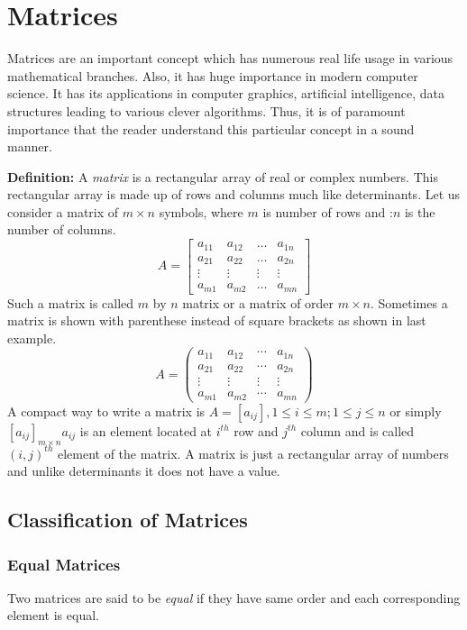 \chapter{Matrices}
Matrices are an important concept which has numerous real life usage in various mathematical branches. Also, it has huge importance
in modern computer science. It has its applications in computer graphics, artificial intelligence, data structures leading to
various clever algorithms. Thus, it is of paramount importance that the reader understand this particular concept in a sound
manner.

\textbf{Definition:} A \textit{matrix} is a rectangular array of real or complex numbers. This rectangular array is made up of rows
and columns much like determinants. Let us consider a matrix of $m\times n$ symbols, where $m$ is number of rows and :$n$ is the
number of columns. $$A = \begin{bmatrix}a_{11} & a_{12} & \ldots & a_{1n} \\ a_{21} & a_{22} & \ldots & a_{2n} \\ \vdots & \vdots &
  \vdots & \vdots \\ a_{m1} & a_{m2} & \ldots & a_{mn}\end{bmatrix}$$
Such a matrix is called $m$ by $n$ matrix or a matrix of order $m\times n$. Sometimes a matrix is shown with parenthese instead of
square brackets as shown in last example.
$$A = \begin{pmatrix}a_{11} & a_{12} & \cdots & a_{1n} \\ a_{21} & a_{22} &
\cdots & a_{2n} \\ \vdots & \vdots & \vdots & \vdots \\ a_{m1} & a_{m2} &
\cdots & a_{mn}\end{pmatrix}$$
A compact way to write a matrix is $A = [a_{ij}], 1\leq i \leq m; 1\leq j \leq n$ or simply $[a_{ij}]_{m\times n} a_{ij}$ is an
element located at $i^{th}$ row and $j^{th}$ column and is called $(i, j)^{th}$ element of the matrix. A matrix is just a
rectangular array of numbers and unlike determinants it does not have a value.

\section{Classification of Matrices}
\subsection{Equal Matrices}
Two matrices are said to be \textit{equal} if they have same order and each corresponding element is equal.

